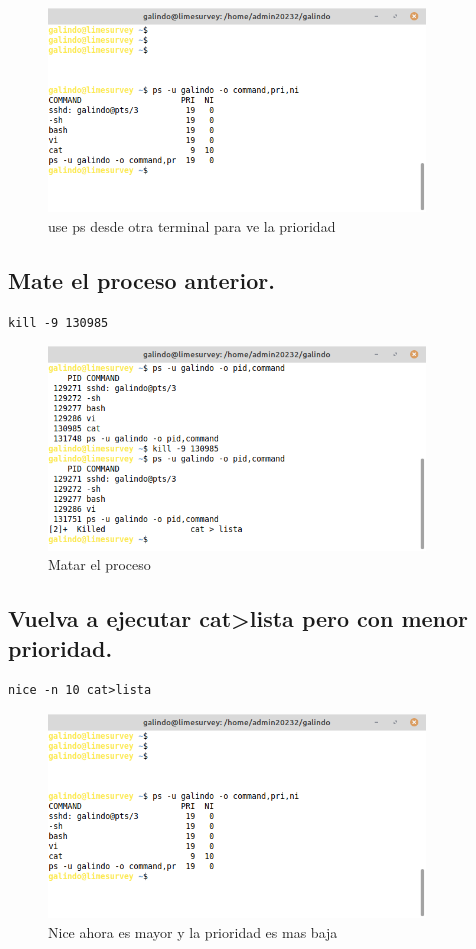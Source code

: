 \documentclass[11pt]{article}
\begin{document}
\begin{figure}[htbp]
\centering
\includegraphics[width=10cm]{img/psprimi.png}
\caption{use ps desde otra terminal para ve la prioridad}
\end{figure}

\pagebreak

\subsection{Mate el proceso anterior.}
\label{sec:org6a72caf}
\begin{verbatim}
kill -9 130985
\end{verbatim}

\begin{figure}[htbp]
\centering
\includegraphics[width=10cm]{img/kill.png}
\caption{Matar el proceso}
\end{figure}

\subsection{Vuelva a ejecutar cat>lista pero con menor prioridad.}
\label{sec:org6d31ed7}
\begin{verbatim}
nice -n 10 cat>lista
\end{verbatim}

\begin{figure}[htbp]
\centering
\includegraphics[width=10cm]{img/psprimi.png}
\caption{Nice ahora es mayor y la prioridad es mas baja}
\end{figure}
\end{document}
